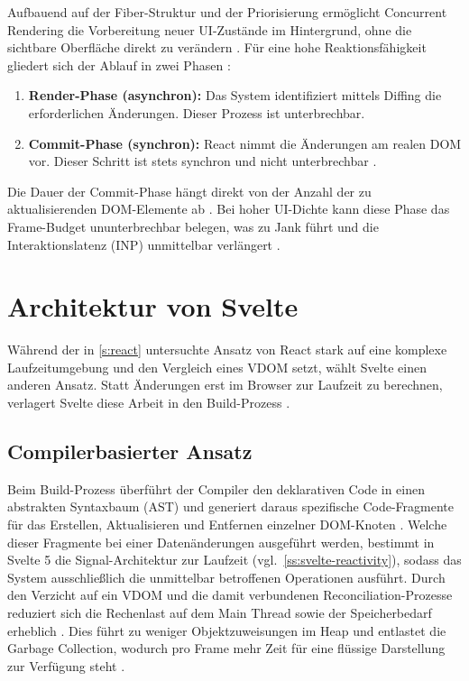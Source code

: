 Aufbauend auf der Fiber-Struktur und der Priorisierung ermöglicht Concurrent Rendering die Vorbereitung neuer UI-Zustände im Hintergrund, ohne die sichtbare Oberfläche direkt zu verändern \cite{react_concurrentrendering-2022}. Für eine hohe Reaktionsfähigkeit gliedert sich der Ablauf in zwei Phasen \cite{medium_fiber-2018}:
\begin{enumerate}
	\item \textbf{Render-Phase (asynchron):} Das System identifiziert mittels Diffing die erforderlichen Änderungen. Dieser Prozess ist unterbrechbar.
	\item \textbf{Commit-Phase (synchron):} React nimmt die Änderungen am realen DOM vor. Dieser Schritt ist stets synchron und nicht unterbrechbar \cite{medium_fiber-2018}.
\end{enumerate}
Die Dauer der Commit-Phase hängt direkt von der Anzahl der zu aktualisierenden DOM-Elemente ab \cite{kumar-fluentreact-2024}. Bei hoher UI-Dichte kann diese Phase das Frame-Budget ununterbrechbar belegen, was zu Jank führt und die Interaktionslatenz (INP) unmittelbar verlängert \cite{web.dev_fiber_2025}.

\section{Architektur von Svelte}
\label{s:svelte}

Während der in \cref{s:react} untersuchte Ansatz von React stark auf eine komplexe Laufzeitumgebung und den Vergleich eines VDOM setzt, wählt Svelte einen anderen Ansatz. Statt Änderungen erst im Browser zur Laufzeit zu berechnen, verlagert Svelte diese Arbeit in den Build-Prozess \cite{github-svelte_arch-2017}.

\subsection{Compilerbasierter Ansatz}
\label{ss:svelte-compiler}

Beim Build-Prozess überführt der Compiler den deklarativen Code in einen abstrakten Syntaxbaum (AST) und generiert daraus spezifische Code-Fragmente für das Erstellen, Aktualisieren und Entfernen einzelner DOM-Knoten \cite{github-svelte_arch-2017, svelte_vdom-2018}. Welche dieser Fragmente bei einer Datenänderungen ausgeführt werden, bestimmt in Svelte 5 die Signal-Architektur zur Laufzeit (vgl.\ \cref{ss:svelte-reactivity}), sodass das System ausschließlich die unmittelbar betroffenen Operationen ausführt. Durch den Verzicht auf ein VDOM und die damit verbundenen Reconciliation-Prozesse reduziert sich die Rechenlast auf dem Main Thread sowie der Speicherbedarf erheblich \cite{svelte_vdom-2018, ollila-rendering_performance-2022}. Dies führt zu weniger Objektzuweisungen im Heap und entlastet die Garbage Collection, wodurch pro Frame mehr Zeit für eine flüssige Darstellung zur Verfügung steht \cite{svelte-reactivity-2019}.

